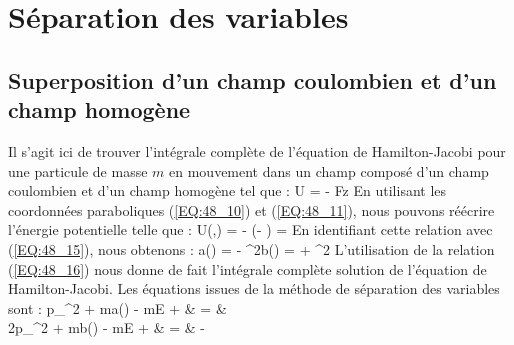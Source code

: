 \section{S\'{e}paration des variables}\label{PAR:48_EX}

\subsection{Superposition d'un champ coulombien et d'un champ homog\`{e}ne}\label{PAR:48_EX1}

Il s'agit ici de trouver l'int\'{e}grale compl\`{e}te de l'\'{e}quation de Hamilton-Jacobi pour une particule de masse $m$ en mouvement dans un champ compos\'{e} d'un champ coulombien et d'un champ homog\`{e}ne tel que :
\benn
	U =  - Fz
\eenn
En utilisant les coordonn\'{e}es paraboliques (\ref{EQ:48_10}) et (\ref{EQ:48_11}), nous pouvons r\'{e}\'{e}crire l'\'{e}nergie potentielle telle que :
\benn
	U(\xi,\eta) = \frac{2\alpha}{\xi + \eta} - (\xi - \eta) = 
\eenn
En identifiant cette relation avec (\ref{EQ:48_15}), nous obtenons :
\benn
	a(\xi) = \alpha - \xi^{2}b(\eta) = \alpha + \eta^{2}
\eenn
L'utilisation de la relation (\ref{EQ:48_16}) nous donne de fait l'int\'{e}grale compl\`{e}te solution de l'\'{e}quation de Hamilton-Jacobi. Les \'{e}quations issues de la m\'{e}thode de s\'{e}paration des variables sont :
\xi p_{\xi}^{2} + ma(\xi) - m\xi E + & = & \beta \nonumber \\
	2\eta p_{\eta}^{2} + mb(\eta) - m\eta E +  & = & -\beta \nonumber
\eea

